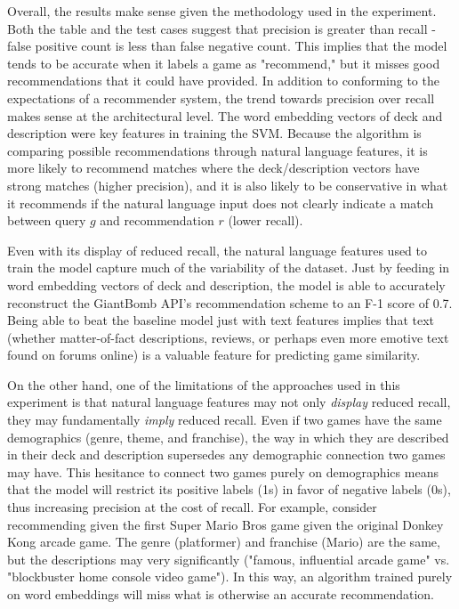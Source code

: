 \documentclass[10pt,twocolumn]{article}
\begin{document}
Overall, the results make sense given the methodology used in the experiment. Both the table and the test cases suggest that precision is greater than recall - false positive count is less than false negative count. This implies that the model tends to be accurate when it labels a game as "recommend," but it misses good recommendations that it could have provided. In addition to conforming to the expectations of a recommender system, the trend towards precision over recall makes sense at the architectural level. The word embedding vectors of deck and description were key features in training the SVM. Because the algorithm is comparing possible recommendations through natural language features, it is more likely to recommend matches where the deck/description vectors have strong matches (higher precision), and it is also likely to be conservative in what it recommends if the natural language input does not clearly indicate a match between query $g$ and recommendation $r$ (lower recall).

Even with its display of reduced recall, the natural language features used to train the model capture much of the variability of the dataset. Just by feeding in word embedding vectors of deck and description, the model is able to accurately reconstruct the GiantBomb API's recommendation scheme to an F-1 score of 0.7. Being able to beat the baseline model just with text features implies that text (whether matter-of-fact descriptions, reviews, or perhaps even more emotive text found on forums online) is a valuable feature for predicting game similarity.

On the other hand, one of the limitations of the approaches used in this experiment is that natural language features may not only \textit{display} reduced recall, they may fundamentally \textit{imply} reduced recall.
Even if two games have the same demographics (genre, theme, and franchise), the way in which they are described in their deck and description supersedes any demographic connection two games may have. This hesitance to connect two games purely on demographics means that the model will restrict its positive labels (1s) in favor of negative labels (0s), thus increasing precision at the cost of recall. For example, consider recommending given the first Super Mario Bros game given the original Donkey Kong arcade game. The genre (platformer) and franchise (Mario) are the same, but the descriptions may very significantly ("famous, influential arcade game" vs. "blockbuster home console video game"). In this way, an algorithm trained purely on word embeddings will miss what is otherwise an accurate recommendation. 
\end{document}
